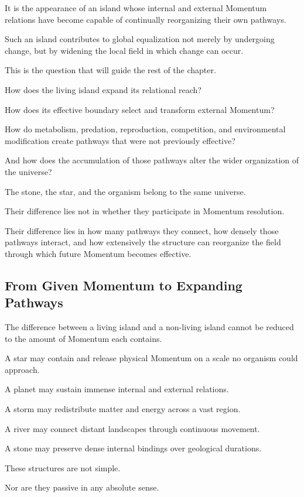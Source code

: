 It is the appearance of an island whose internal and external Momentum relations have become capable of continually reorganizing their own pathways.

Such an island contributes to global equalization not merely by undergoing change, but by widening the local field in which change can occur.

This is the question that will guide the rest of the chapter.

How does the living island expand its relational reach?

How does its effective boundary select and transform external Momentum?

How do metabolism, predation, reproduction, competition, and environmental modification create pathways that were not previously effective?

And how does the accumulation of those pathways alter the wider organization of the universe?

The stone, the star, and the organism belong to the same universe.

Their difference lies not in whether they participate in Momentum resolution.

Their difference lies in how many pathways they connect, how densely those pathways interact, and how extensively the structure can reorganize the field through which future Momentum becomes effective.

\subsection*{\textbf{From Given Momentum to Expanding Pathways}}


The difference between a living island and a non-living island cannot be reduced to the amount of Momentum each contains.

A star may contain and release physical Momentum on a scale no organism could approach.

A planet may sustain immense internal and external relations.

A storm may redistribute matter and energy across a vast region.

A river may connect distant landscapes through continuous movement.

A stone may preserve dense internal bindings over geological durations.

These structures are not simple.

Nor are they passive in any absolute sense.

